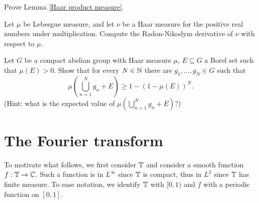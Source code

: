 \begin{exercise}
\label{Haar product measure exercise}
Prove Lemma \ref{Haar product measure}.
\end{exercise}

\begin{exercise}
Let $\mu$ be Lebesgue measure, and let $\nu$ be a Haar measure for the positive real numbers under multiplication.
Compute the Radon-Nikodym derivative of $\nu$ with respect to $\mu$.
\end{exercise}

\begin{exercise}
Let $G$ be a compact abelian group with Haar measure $\mu$, $E \subseteq G$ a Borel set such that $\mu(E) > 0$.
Show that for every $N \in \mathbb{N}$ there are $g_1, \dots, g_N \in G$ such that
$$\mu\left(\bigcup_{n=1}^N g_n + E\right) \geq 1 - (1 - \mu(E))^N.$$
(Hint: what is the expected value of $\mu\left(\bigcup_{n=1}^N g_n + E\right)$?)
\end{exercise}

\section{The Fourier transform}
To motivate what follows, we first consider $\mathbb{T}$ and consider a smooth function $f: \mathbb{T} \to \mathbb{C}$.
Such a function is in $L^\infty$ since $\mathbb{T}$ is compact, thus in $L^2$ since $\mathbb{T}$ has finite measure.
To ease notation, we identify $\mathbb{T}$ with $[0, 1)$ and $f$ with a periodic function on $[0, 1]$.

